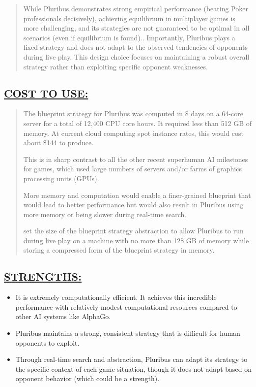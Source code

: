 \documentclass[
]{article}
\begin{document}
\begin{quote}
While Pluribus demonstrates strong empirical performance (beating Poker
professionals decisively), achieving equilibrium in multiplayer games is
more challenging, and its strategies are not guaranteed to be optimal in
all scenarios (even if equilibrium is found).. Importantly, Pluribus
plays a fixed strategy and does not adapt to the observed tendencies of
opponents during live play. This design choice focuses on maintaining a
robust overall strategy rather than exploiting specific opponent
weaknesses.
\end{quote}

\subsection*{\texorpdfstring{\textbf{\ul{COST TO
USE:}}}{COST TO USE:}}\label{cost-to-use}

\begin{quote}
The blueprint strategy for Pluribus was computed in 8 days on a 64-core
server for a total of 12,400 CPU core hours. It required less than 512
GB of memory. At current cloud computing spot instance rates, this would
cost about \$144 to produce.

This is in sharp contrast to all the other recent superhuman AI
milestones for games, which used large numbers of servers and/or farms
of graphics processing units (GPUs).

More memory and computation would enable a finer-grained blueprint that
would lead to better performance but would also result in Pluribus using
more memory or being slower during real-time search.

set the size of the blueprint strategy abstraction to allow Pluribus to
run during live play on a machine with no more than 128 GB of memory
while storing a compressed form of the blueprint strategy in memory.
\end{quote}

\subsection*{\texorpdfstring{\textbf{\ul{STRENGTHS:}}}{STRENGTHS:}}\label{strengths-1}

\begin{itemize}
\item
  It is extremely computationally efficient. It achieves this incredible
  performance with relatively modest computational resources compared to
  other AI systems like AlphaGo.
\item
  Pluribus maintains a strong, consistent strategy that is difficult for
  human opponents to exploit.
\item
  Through real-time search and abstraction, Pluribus can adapt its
  strategy to the specific context of each game situation, though it
  does not adapt based on opponent behavior (which could be a strength).
\end{itemize}
\end{document}
